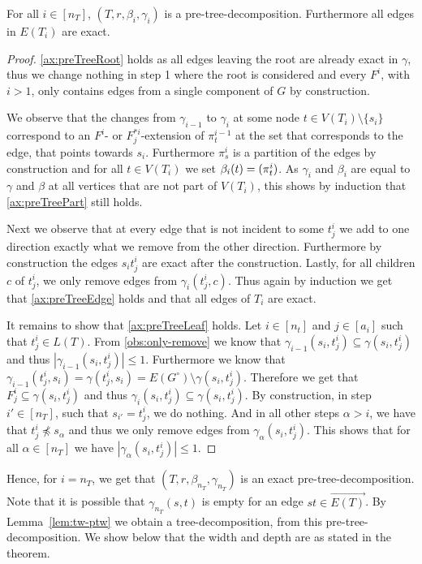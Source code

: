 \documentclass{lmcs}
\theoremstyle{plain}\newtheorem{claim}[thm]{Claim}   %
\let\boundary\relax
\newcommand{\boundary}{\Delta}
\newcommand{\preTreeDec}{pre-tree-decomposition}
\begin{document}
\begin{lem}
	\label{lem:exact}
	For all $i\in[n_T]$, $(T,r,\beta_i,\gamma_i)$ is a \preTreeDec.
	Furthermore all edges in $E(T_i)$ are exact.
\end{lem}

\begin{proof}
	\ref{ax:preTreeRoot} holds as all edges leaving the root are already exact in $\gamma$, thus we change nothing in step 1 where the root is considered and every $F^i$, with $i>1$, only contains edges from a single component of $G$ by construction.
	
	We observe that the changes from $\gamma_{i-1}$ to $\gamma_{i}$ at some node $t\in V(T_i)\setminus \{s_i\}$ correspond to an $F^i$- or $F^{*i}_j$-extension of $\pi^{i-1}_t$ at the set that corresponds to the edge, that points towards $s_i$.
	Furthermore $\pi^i_s$ is a partition of the edges by construction and for all $t\in V(T_i)$ we set $\beta_i(t)=\boundary(\pi^i_t)$.
	As $\gamma_i$ and $\beta_i$ are equal to $\gamma$ and $\beta$ at all vertices that are not part of $V(T_i)$, this shows by induction that \ref{ax:preTreePart} still holds.
	
	Next we observe that at every edge that is not incident to some $t^i_j$ we add to one direction exactly what we remove from the other direction.
	Furthermore by construction the edges $s_i t^i_j$ are exact after the construction.
	Lastly, for all children $c$ of $t^i_j$, we only remove edges from $\gamma_i(t^i_j,c)$.
	Thus again by induction we get that \ref{ax:preTreeEdge} holds and that all edges of $T_i$ are exact.
	
	It remains to show that \ref{ax:preTreeLeaf} holds.
	Let $i\in[n_t]$ and $j\in[a_i]$ such that $t^i_j\in L(T)$.
	From \autoref{obs:only-remove} we know that $\gamma_{i-1}(s_i,t^i_j)\subseteq \gamma(s_i,t^i_j)$ and thus $|\gamma_{i-1}(s_i,t^i_j)|\leq 1$.
	Furthermore we know that $\gamma_{i-1}(t^i_j,s_i)=\gamma(t^i_j,s_i)= E(G^\circ)\setminus \gamma(s_i,t^i_j)$.
	Therefore we get that $F^i_j\subseteq \gamma(s_i,t^i_j)$ and thus $\gamma_{i}(s_i,t^i_j)\subseteq \gamma(s_i,t^i_j)$.
	By construction, in step $i'\in[n_T]$, such that $s_{i'}=t^i_j$, we do nothing.
	And in all other steps $\alpha > i$, we have that $t^i_j\not\preceq s_\alpha$ and thus we only remove edges from $\gamma_{\alpha}(s_i,t^i_j)$.
	This shows that for all $\alpha\in[n_T]$ we have $|\gamma_{\alpha}(s_i,t^i_j)|\leq 1$.
\end{proof}


Hence, for $i=n_T$, we get that $(T,r,\beta_{n_T},\gamma_{n_T})$ is an exact \preTreeDec. 
Note that it is possible that $\gamma_{n_T}(s,t)$ is empty for an edge $st\in \overrightarrow{E(T)}$.
By Lemma~\ref{lem:tw-ptw} we obtain a tree-decomposition, from this \preTreeDec.
We show below that the width and depth are as stated in the theorem.
\end{document}
